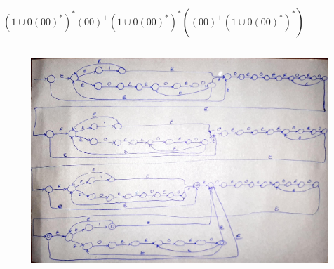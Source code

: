 \documentclass{article}
\begin{document}
\section{}%
\subsection{}
\begin{latin}
$
\left( 1 \cup 0\left( 00 \right) ^ * \right) ^ * \left( 00 \right) ^ + \left( 1 \cup 0\left( 00 \right) ^ * \right) ^ * \left( \left( 00 \right) ^ + \left( 1 \cup 0\left( 00 \right) ^ * \right) ^ * \right) ^ +
$
\end{latin}
\subsection{}
\begin{figure}[H]
    \centering
    \includegraphics[width=1\textwidth]{figures/3a.jpg}
    \caption
	{}
    \label{fig:fig1}
\end{figure}

\section{}%
\section{}%
\section{}%

\section{}%
\end{document}
